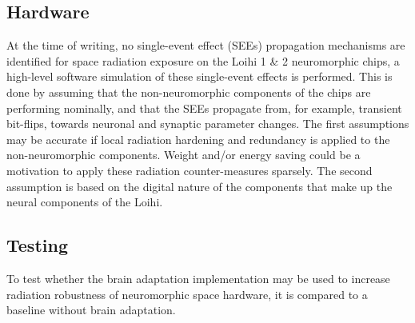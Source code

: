\subsection{Hardware}\label{subsec:hardware}
At the time of writing, no single-event effect (SEEs) propagation mechanisms are identified for space radiation exposure on the Loihi 1 \& 2  neuromorphic chips, a high-level software simulation of these single-event effects is performed. This is done by assuming that the non-neuromorphic components of the chips are performing nominally, and that the SEEs propagate from, for example, transient bit-flips, towards neuronal and synaptic parameter changes. The first assumptions may be accurate if local radiation hardening and redundancy is applied to the non-neuromorphic components. Weight and/or energy saving could be a motivation to apply these radiation counter-measures sparsely. The second assumption is based on the digital nature of the components that make up the neural components of the Loihi. %




\subsection{Testing}\label{subsec:testing}
To test whether the brain adaptation implementation may be used to increase radiation robustness of neuromorphic space hardware, it is compared to a baseline without brain adaptation. 

